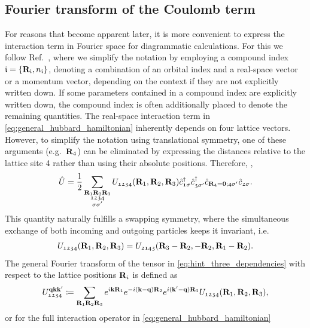 \documentclass[../../main.tex]{subfiles}
\begin{document}
\subsection{Fourier transform of the Coulomb term}

For reasons that become apparent later, it is more convenient to express the interaction term in Fourier space for diagrammatic calculations. For this we follow Ref.~\cite{Galler2017}, where we simplify the notation by employing a compound index $\mathfrak{i}=\{\textbf{R}_{\mathfrak{i}}, n_{\mathfrak{i}}\}$, denoting a combination of an orbital index and a real-space vector or a momentum vector, depending on the context if they are not explicitly written down. If some parameters contained in a compound index are explicitly written down, the compound index is often additionally placed to denote the remaining quantities. The real-space interaction term in \eqref{eq:general_hubbard_hamiltonian} inherently depends on four lattice vectors. However, to simplify the notation using translational symmetry, one of these arguments (e.g.\ $\textbf{R}_4$) can be eliminated by expressing the distances relative to the lattice site 4 rather than using their absolute positions. Therefore, \cite{Galler2017}, 
\begin{align}
	\hat U=\frac 12 \sum_{\substack{\textbf{R}_1\textbf{R}_2\textbf{R}_3\\ \mathfrak{1234}\\\sigma\sigma'}}U_{\mathfrak{1234}}(\textbf{R}_1,\textbf{R}_2,\textbf{R}_3) \hat c^{\dagger}_{\mathfrak{1}\sigma} \hat c^{\dagger}_{ \mathfrak{3}\sigma'} \hat c_{\textbf{R}_4=\textbf{0};\mathfrak{4}\sigma'} \hat c_{\mathfrak{2}\sigma}.\label{eq:hint_three_dependencies}
\end{align} 
This quantity naturally fulfills a swapping symmetry, where the simultaneous exchange of both incoming and outgoing particles keeps it invariant, i.e.\
\begin{align}
 	U_{\mathfrak{1234}}(\textbf{R}_1,\textbf{R}_2,\textbf{R}_3)=U_{\mathfrak{2143}}(\textbf{R}_3-\textbf{R}_2,-\textbf{R}_2,\textbf{R}_1-\textbf{R}_2).
\end{align} 
The general Fourier transform of the tensor in \eqref{eq:hint_three_dependencies} with respect to the lattice positions $\textbf{R}_i$ is defined as
\begin{align}
	U_{\mathfrak{1234}}^{\textbf{qkk}'}\coloneq\sum_{\textbf{R}_1\textbf{R}_2\textbf{R}_3} e^{i\textbf{kR}_1}e^{-i(\textbf{k}-\textbf{q})\textbf{R}_2}e^{i(\textbf{k}'-\textbf{q})\textbf{R}_3}U_{\mathfrak{1234}}(\textbf{R}_1,\textbf{R}_2,\textbf{R}_3),
\end{align}
or for the full interaction operator in \eqref{eq:general_hubbard_hamiltonian}
\end{document}
